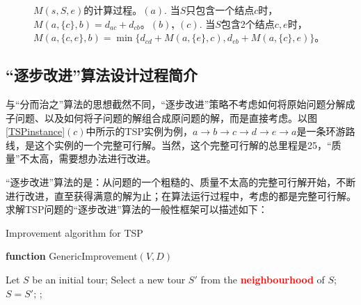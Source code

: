 \begin{figure}[htp]
%
%
%
%
%
%     
%     
%        
%
%        

	\caption{\fangsong $M(s, S, e)$的计算过程。{\bf $(a)$}. 当$S$只包含一个结点$c$时，$M(a, \{c\}, b) = d_{ac} + d_{cb}$。{\bf $(b)$, $(c)$}. 当$S$包含2个结点$c, e$时，$M(a, \{c, e\}, b) = \min\{ d_{cd} + M(a, \{e\}, c), d_{eb} + M(a, \{ c\}, e)\}$。}
		\label{MSE}
\end{figure}

\subsection{“逐步改进”算法设计过程简介}
	与“分而治之”算法的思想截然不同，“逐步改进”策略不考虑如何将原始问题分解成子问题、以及如何将子问题的解组合成原问题的解，而是直接考虑。以图\ref{TSPinstance}$(c)$中所示的TSP实例为例，$a\rightarrow b  \rightarrow c \rightarrow d \rightarrow e \rightarrow a$是一条环游路线，是这个实例的一个完整可行解。当然，这个完整可行解的总里程是25，“质量”不太高，需要想办法进行改进。

   “逐步改进”算法的是：从问题的一个粗糙的、质量不太高的完整可行解开始，不断进行改进，直至获得满意的解为止；在算法运行过程中，考虑的都是完整可行解。求解TSP问题的“逐步改进”算法的一般性框架可以描述如下：
   
\begin{algorithm}[H]
\caption{Improvement algorithm for TSP}\label{TSPImprovementAlgo}
{\bf function} {\sc GenericImprovement}$(V, D)$
\begin{algorithmic}[1]
\STATE Let $S$ be an initial tour; 
	\STATE Select a new tour $S'$ from the \textcolor{red}{\bf neighbourhood} of $S$; 
		\STATE $S = S'$; 
	\ENDIF
		; 
	\ENDIF
\ENDWHILE
\end{algorithmic}
\end{algorithm}

